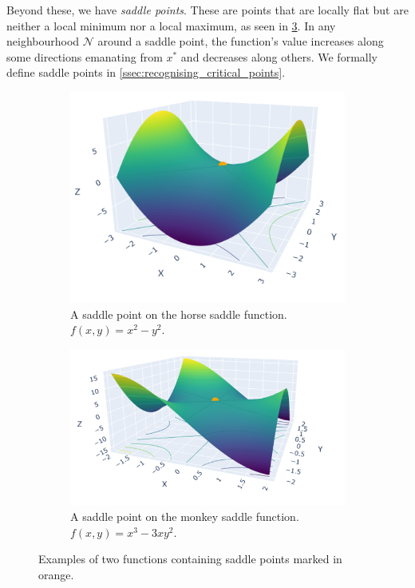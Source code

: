 Beyond these, we have \textit{saddle points}. These are points that are locally flat but are neither a local minimum nor a local maximum, as seen in \cref{fig:saddle_point}. In any neighbourhood $\mathcal{N}$ around a saddle point, the function's value increases along some directions emanating from $x^*$ and decreases along others. We formally define saddle points in \cref{ssec:recognising_critical_points}.

\begin{figure}[h]
    \begin{subfigure}[b]{0.48\linewidth}
        \centering
        \includegraphics[width=0.8\linewidth]{figures/2background/horse_saddle.png}
        \caption{A saddle point on the horse saddle function. \\
        $f(x,y) = x^2 - y^2$.}
        \label{fig:horse_saddle}
    \end{subfigure}
    \hfill
    \begin{subfigure}[b]{0.48\linewidth}
        \centering
        \includegraphics[width=\linewidth]{figures/2background/monkey_saddle.png}
        \caption{A saddle point on the monkey saddle function. \\
        $f(x,y) = x^3 - 3xy^2$.}
        \label{fig:monkey_saddle}
    \end{subfigure}
    \caption{Examples of two functions containing saddle points marked in orange.}
    \label{fig:saddle_point}
\end{figure}

